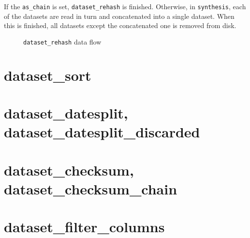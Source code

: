 If the \texttt{as\_chain} is set, \texttt{dataset\_rehash} is finished.
Otherwise, in \texttt{synthesis}, each of the datasets are read in
turn and concatenated into a single dataset.  When this is finished,
all datasets except the concatenated one is removed from disk.


\begin{figure}[h!]
  \begin{center}
    
  \end{center}
  \caption{\texttt{dataset\_rehash} data flow}
  \label{fig:dataset_rehash}
\end{figure}



\clearpage
\section{dataset\_sort}

\clearpage
\section{dataset\_datesplit, dataset\_datesplit\_discarded}

\clearpage
\section{dataset\_checksum, dataset\_checksum\_chain}

\clearpage
\section{dataset\_filter\_columns}

